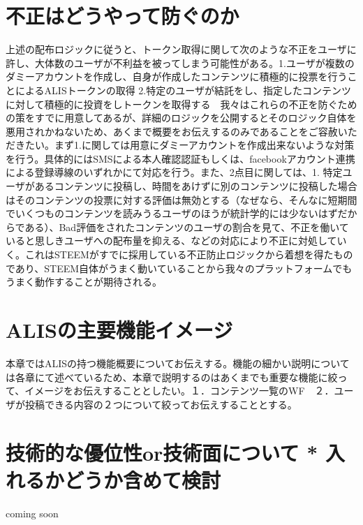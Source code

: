 \documentclass{jsarticle}
\begin{document}
\section{不正はどうやって防ぐのか}
上述の配布ロジックに従うと、トークン取得に関して次のような不正をユーザに許し、大体数のユーザが不利益を被ってしまう可能性がある。1.ユーザが複数のダミーアカウントを作成し、自身が作成したコンテンツに積極的に投票を行うことによるALISトークンの取得 2.特定のユーザが結託をし、指定したコンテンツに対して積極的に投資をしトークンを取得する　我々はこれらの不正を防ぐための策をすでに用意してあるが、詳細のロジックを公開するとそのロジック自体を悪用されかねないため、あくまで概要をお伝えするのみであることをご容赦いただきたい。まず1.に関しては用意にダミーアカウントを作成出来ないような対策を行う。具体的にはSMSによる本人確認認証もしくは、facebookアカウント連携による登録導線のいずれかにて対応を行う。また、2点目に関しては、1. 特定ユーザがあるコンテンツに投稿し、時間をあけずに別のコンテンツに投稿した場合はそのコンテンツの投票に対する評価は無効とする（なぜなら、そんなに短期間でいくつものコンテンツを読みうるユーザのほうが統計学的には少ないはずだからである）、Bad評価をされたコンテンツのユーザの割合を見て、不正を働いていると思しきユーザへの配布量を抑える、などの対応により不正に対処していく。これはSTEEMがすでに採用している不正防止ロジックから着想を得たものであり、STEEM自体がうまく動いていることから我々のプラットフォームでもうまく動作することが期待される。
\section{ALISの主要機能イメージ}
本章ではALISの持つ機能概要についてお伝えする。機能の細かい説明については各章にて述べているため、本章で説明するのはあくまでも重要な機能に絞って、イメージをお伝えすることとしたい。１．コンテンツ一覧のWF　２．ユーザが投稿できる内容の２つについて絞ってお伝えすることとする。
\section{技術的な優位性or技術面について * 入れるかどうか含めて検討}
coming soon
\end{document}

